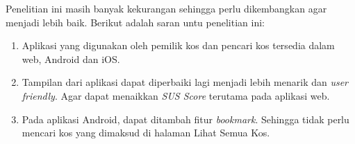 	Penelitian ini masih banyak kekurangan sehingga perlu dikembangkan agar menjadi lebih baik. Berikut adalah saran untu penelitian ini:
	\begin{enumerate}
		\item Aplikasi yang digunakan oleh pemilik kos dan pencari kos tersedia dalam web, Android dan iOS.
		\item Tampilan dari aplikasi dapat diperbaiki lagi menjadi lebih menarik dan \textit{user friendly}. Agar dapat menaikkan \textit{SUS Score} terutama pada aplikasi web.
		\item Pada aplikasi Android, dapat ditambah fitur \textit{bookmark}. Sehingga tidak perlu mencari kos yang dimaksud di halaman Lihat Semua Kos. 
	\end{enumerate}

	
\begin{comment}

\end{comment}
